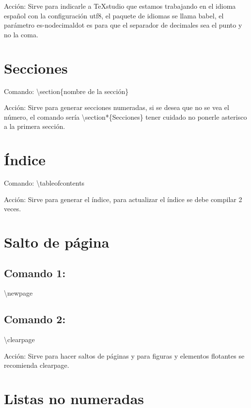 \documentclass[a4paper, 12pt]{article}
\begin{document}
\begin{flushleft}
		Acción: Sirve para indicarle a TeXstudio que estamos trabajando en el idioma español con la configuración utf8, el paquete de idiomas se llama babel, el parámetro es-nodecimaldot es para que el separador de decimales sea el punto y no  la coma.\newline
		
		\section{Secciones}
		
		Comando: \textbackslash section\{nombre de la sección\}\newline
		
		Acción: Sirve para generar secciones numeradas, si se desea que no  se vea el número, el comando  sería \textbackslash section*\{Secciones\} tener cuidado no ponerle asterisco a la primera sección.\newline
		
		\section{Índice}
		
		Comando: \textbackslash tableofcontents\newline
		
		Acción: Sirve para generar el índice, para actualizar el índice se debe compilar 2 veces.\newline
		
		\section{Salto de página}
		
		\subsection{Comando 1:} \textbackslash newpage\newline
		\subsection{Comando 2:} \textbackslash clearpage\newline
		
		Acción: Sirve para hacer saltos de páginas y para figuras y elementos flotantes se recomienda clearpage.\newline
		
		\section{Listas no numeradas}
		

\end{flushleft}
\end{document}
